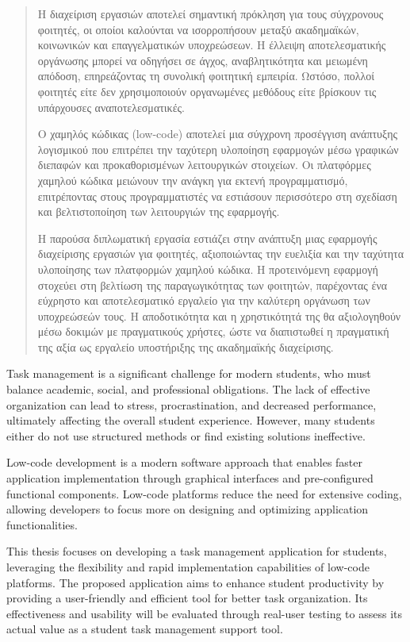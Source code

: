 \begin{abstract}
    Η διαχείριση εργασιών αποτελεί σημαντική πρόκληση για τους σύγχρονους φοιτητές, οι οποίοι καλούνται να ισορροπήσουν μεταξύ ακαδημαϊκών, κοινωνικών και επαγγελματικών υποχρεώσεων. Η έλλειψη αποτελεσματικής οργάνωσης μπορεί να οδηγήσει σε άγχος, αναβλητικότητα και μειωμένη απόδοση, επηρεάζοντας τη συνολική φοιτητική εμπειρία. Ωστόσο, πολλοί φοιτητές είτε δεν χρησιμοποιούν οργανωμένες μεθόδους είτε βρίσκουν τις υπάρχουσες αναποτελεσματικές.

    Ο χαμηλός κώδικας (low-code) αποτελεί μια σύγχρονη προσέγγιση ανάπτυξης λογισμικού που επιτρέπει την ταχύτερη υλοποίηση εφαρμογών μέσω γραφικών διεπαφών και προκαθορισμένων λειτουργικών στοιχείων. Οι πλατφόρμες χαμηλού κώδικα μειώνουν την ανάγκη για εκτενή προγραμματισμό, επιτρέποντας στους προγραμματιστές να εστιάσουν περισσότερο στη σχεδίαση και βελτιστοποίηση των λειτουργιών της εφαρμογής.

    Η παρούσα διπλωματική εργασία εστιάζει στην ανάπτυξη μιας εφαρμογής διαχείρισης εργασιών για φοιτητές, αξιοποιώντας την ευελιξία και την ταχύτητα υλοποίησης των πλατφορμών χαμηλού κώδικα. Η προτεινόμενη εφαρμογή στοχεύει στη βελτίωση της παραγωγικότητας των φοιτητών, παρέχοντας ένα εύχρηστο και αποτελεσματικό εργαλείο για την καλύτερη οργάνωση των υποχρεώσεών τους. Η αποδοτικότητα και η χρηστικότητά της θα αξιολογηθούν μέσω δοκιμών με πραγματικούς χρήστες, ώστε να διαπιστωθεί η πραγματική της αξία ως εργαλείο υποστήριξης της ακαδημαϊκής διαχείρισης.

\end{abstract}


\begin{abstracteng}
    Task management is a significant challenge for modern students, who must balance academic, social, and professional obligations. The lack of effective organization can lead to stress, procrastination, and decreased performance, ultimately affecting the overall student experience. However, many students either do not use structured methods or find existing solutions ineffective.

    Low-code development is a modern software approach that enables faster application implementation through graphical interfaces and pre-configured functional components. Low-code platforms reduce the need for extensive coding, allowing developers to focus more on designing and optimizing application functionalities.

    This thesis focuses on developing a task management application for students, leveraging the flexibility and rapid implementation capabilities of low-code platforms. The proposed application aims to enhance student productivity by providing a user-friendly and efficient tool for better task organization. Its effectiveness and usability will be evaluated through real-user testing to assess its actual value as a student task management support tool.

\end{abstracteng}